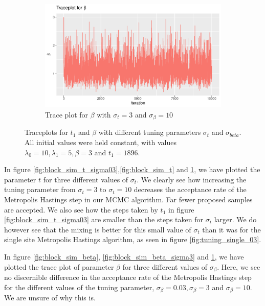 \begin{figure}[H]
\begin{subfigure}[b]{0.49\textwidth}
        \includegraphics[width = \textwidth]{Images/block_sim_beta_sigma10.pdf}
        \caption{Trace plot for $\beta$ with $\sigma_t = 3$ and $\sigma_{\beta} = 10$}
        \label{fig:block_sim_beta_sigma10}
    \end{subfigure}
    \caption{Traceplots for $t_1$ and $\beta$ with different tuning parameters $\sigma_t$ and $\sigma_{beta}$. All initial values were held constant, with values $\lambda_0 = 10, \lambda_1 = 5, \beta = 3$ and $t_1 = 1896$.}
    \label{fig:block_tuning}
\end{figure}


 In figure \ref{fig:block_sim_t_sigma03},\ref{fig:block_sim_t} and \ref{fig:block_sim_beta_sigma10}, we have plotted the parameter $t$  for three different values of $\sigma_t$. We clearly see how increasing the tuning parameter from $\sigma_t = 3$ to $\sigma_t = 10$ decreases the acceptance rate of the Metropolis Hastings step in our MCMC algorithm. Far fewer proposed samples are accepted. We also see how the steps taken by $t_1$ in figure \ref{fig:block_sim_t_sigma03} are smaller than the steps taken for $\sigma_t$ larger. We do however see that the mixing is better for this small value of $\sigma_t$ than it was for the single site Metropolis Hastings algorithm, as seen in figure \ref{fig:tuning_single_03}.
 
 In figure \ref{fig:block_sim_beta}, \ref{fig:block_sim_beta_sigma3} and \ref{fig:block_sim_beta_sigma10}, we have plotted the trace plot of parameter $\beta$ for three different values of $\sigma_{\beta}$. Here, we see no discernible difference in the acceptance rate of the Metropolis Hastings step for the different values of the tuning parameter, $\sigma_{\beta} = 0.03, \sigma_{\beta} = 3$ and $\sigma_{\beta} = 10$. We are unsure of why this is.


